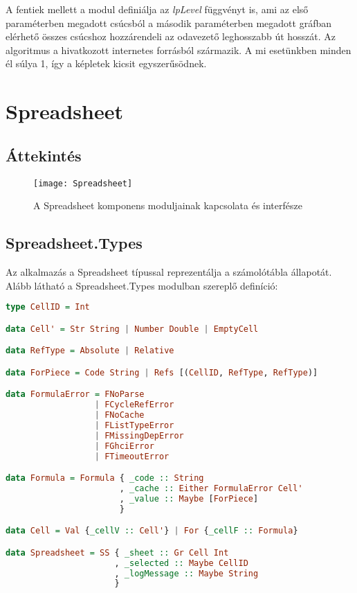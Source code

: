 A fentiek mellett a modul definiálja az \textit{lpLevel} függvényt is, ami az első paraméterben megadott csúcsból a második paraméterben megadott gráfban elérhető összes csúcshoz hozzárendeli az odavezető leghosszabb út hosszát. Az algoritmus a hivatkozott internetes forrásból \cite{lp_geeks} származik. A mi esetünkben minden él súlya 1, így a képletek kicsit egyszerűsödnek.

\section{Spreadsheet}

\subsection{Áttekintés}

\begin{figure}[H]
	\centering
	\texttt{[image: Spreadsheet]}
	\caption{A Spreadsheet komponens moduljainak kapcsolata és interfésze}
	\label{fig:appstructure}
\end{figure}

\subsection{Spreadsheet.Types}

Az alkalmazás a Spreadsheet típussal reprezentálja a számolótábla állapotát. Alább látható a Spreadsheet.Types modulban szereplő definíció:

\begin{lstlisting}[language={Haskell}]
type CellID = Int

data Cell' = Str String | Number Double | EmptyCell

data RefType = Absolute | Relative

data ForPiece = Code String | Refs [(CellID, RefType, RefType)]

data FormulaError = FNoParse
                  | FCycleRefError
                  | FNoCache
                  | FListTypeError
                  | FMissingDepError
                  | FGhciError
                  | FTimeoutError

data Formula = Formula { _code :: String
                       , _cache :: Either FormulaError Cell'
                       , _value :: Maybe [ForPiece]
                       }

data Cell = Val {_cellV :: Cell'} | For {_cellF :: Formula}

data Spreadsheet = SS { _sheet :: Gr Cell Int
                      , _selected :: Maybe CellID
                      , _logMessage :: Maybe String
                      }
\end{lstlisting}

